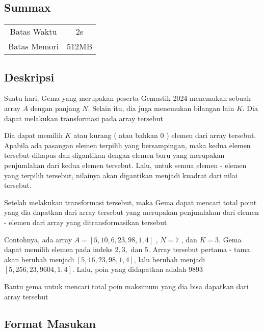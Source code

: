 \documentclass{article}
\begin{document}
\begin{center}

    
    \section*{Summax} %

    \begin{tabular}{ | c c | }
        \hline
        Batas Waktu  & 2s \\    %
        Batas Memori & 512MB \\  %
        \hline
    \end{tabular}
\end{center}

\subsection*{Deskripsi}

Suatu hari, Gema yang merupakan peserta Gemastik 2024 menemukan sebuah array $A$ dengan panjang $N$. Selain itu, dia juga menemukan bilangan lain $K$. Dia dapat melakukan transformasi pada array tersebut

Dia dapat memilih $K$ atau kurang ( atau bahkan 0 ) elemen dari array tersebut. Apabila ada pasangan elemen terpilih yang bersampingan, maka kedua elemen tersebut dihapus dan digantikan dengan elemen baru yang merupakan penjumlahan dari kedua elemen tersebut. Lalu, untuk semua elemen - elemen yang terpilih tersebut, nilainya akan digantikan menjadi kuadrat dari nilai tersebut. 

Setelah melakukan transformasi tersebut, maka Gema dapat mencari total point yang dia dapatkan dari array tersebut yang merupakan penjumlahan dari elemen - elemen dari array yang ditransformasikan tersebut

Contohnya, ada array $A = [5,10,6,23,98,1,4]$ , $N = 7$ , dan $K = 3$. Gema dapat memilih elemen pada indeks $2,3,$ dan $5$. Array tersebut pertama - tama akan berubah menjadi  $ [5,16,23,98,1,4]$, lalu berubah menjadi  $ [5,256,23,9604,1,4]$. Lalu, poin yang didapatkan adalah 9893

Bantu gema untuk mencari total poin maksimum yang dia bisa dapatkan dari array tersebut

\subsection*{Format Masukan}
\end{document}
